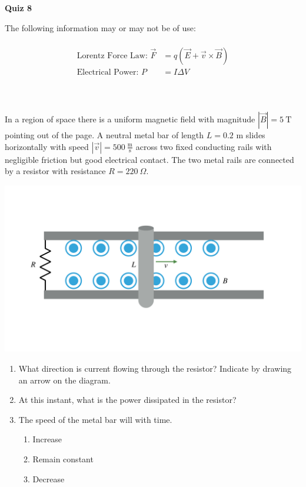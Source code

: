 \documentclass{article}
\begin{document}
	\fancyfoot[C]{\thepage}
	\vspace*{0cm}
	\begin{center}
		{\LARGE \textbf{Quiz 8}}
	\end{center}
	
The following information may or may not be of use:\\
\hrulefill\\
\begin{align*}
	\text{Lorentz Force Law: } \vec{F}&=q\left(\vec{E}+\vec{v}\times\vec{B}\right)\\
	\text{Electrical Power: } P &= I\Delta V\\
\end{align*}

\hrulefill \\
\\

In a region of space there is a uniform magnetic field with magnitude $\left|\vec{B}\right|=5\ \mathrm{T}$ pointing out of the page. A neutral metal bar of length $L=0.2$ m slides horizontally with speed $\left|\vec{v}\right|=500\ \frac{\mathrm{m}}{\mathrm{s}}$ across two fixed conducting rails with negligible friction but good electrical contact. The two metal rails are connected by a resistor with resistance $R=220\ \Omega$.
\begin{center}
	\includegraphics[width=.5\textwidth]{motional_emf}
\end{center}

\begin{enumerate}
	\item What direction is current flowing through the resistor? Indicate by drawing an arrow on the diagram.
	\vspace{1cm}
	\item At this instant, what is the power dissipated in the resistor?
	\vspace{5cm}
	\item The speed of the metal bar will \underline{\hspace{1cm}} with time.
	\begin{enumerate}
		\item Increase
		\item Remain constant
		\item Decrease
	\end{enumerate}
\end{enumerate}
\end{document}

